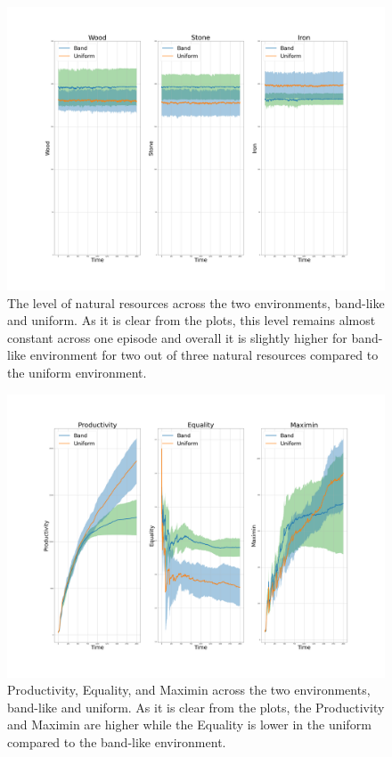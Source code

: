 \documentclass{article}
\begin{document}
\begin{figure}
	\centering
	\includegraphics[width=0.7\linewidth]{"A_Multi-agent_Reinforcement_Learning_Study_of_Emergence_of_Social_Classes_out_of_Arbitrary_Governance_The_Role_of_Environment_Plots/Amount_of_Three_Material_Resources_across_an_Episode_for_Two_Scenarios"}
	\caption{The level of natural resources across the two environments, band-like and uniform. As it is clear from the plots, this level remains almost constant across one episode and overall it is slightly higher for band-like environment for two out of three natural resources compared to the uniform environment.}
	\label{Figure4}
\end{figure}

\begin{figure}
	\centering
	\includegraphics[width=0.7\linewidth]{"A_Multi-agent_Reinforcement_Learning_Study_of_Emergence_of_Social_Classes_out_of_Arbitrary_Governance_The_Role_of_Environment_Plots/Productivity,_Equality,_and_Maximin_across_an_Episode_for_Two_Scenarios"}
	\caption{Productivity, Equality, and Maximin across the two environments, band-like and uniform. As it is clear from the plots, the Productivity and Maximin are higher while the Equality is lower in the uniform compared to the band-like environment.}
	\label{Figure5}
\end{figure}
\end{document}
